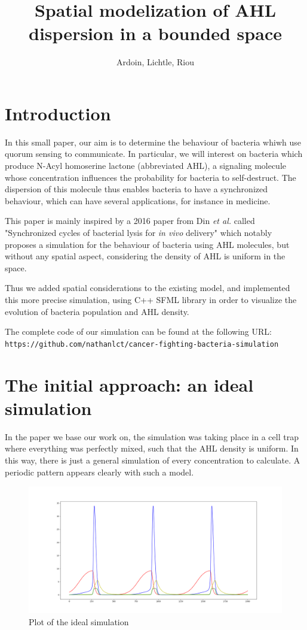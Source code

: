 \documentclass[a4paper]{article}
\title{Spatial modelization of AHL dispersion in a bounded space}
\author{Ardoin, Lichtle, Riou}
\theoremstyle{definition}
\begin{document}
\maketitle

\section*{Introduction}

In this small paper, our aim is to determine the behaviour of bacteria whiwh use quorum sensing to communicate. In particular, we will interest on bacteria which produce N-Acyl homoserine lactone (abbreviated AHL), a signaling molecule whose concentration influences the probability for bacteria to self-destruct. The dispersion of this molecule thus enables bacteria to have a synchronized behaviour, which can have several applications, for instance in medicine.

This paper is mainly inspired by a 2016 paper from Din \textit{et al.} called "Synchronized cycles of bacterial lysis for \textit{in vivo} delivery" which notably proposes a simulation for the behaviour of bacteria using AHL molecules, but without any spatial aspect, considering the density of AHL is uniform in the space.

Thus we added spatial considerations to the existing model, and implemented this more precise simulation, using C++ SFML library in order to visualize the evolution of bacteria population and AHL density.

The complete code of our simulation can be found at the following URL:\\ \texttt{https://github.com/nathanlct/cancer-fighting-bacteria-simulation}

\section{The initial approach: an ideal simulation}

In the paper we base our work on, the simulation was taking place in a cell trap where everything was perfectly mixed, such that the AHL density is uniform. In this way, there is just a general simulation of every concentration to calculate. A periodic pattern appears clearly with such a model.

\begin{figure}[!h]
        \centering
        \includegraphics[width=1\textwidth]{Figure_2.png}
        \caption{Plot of the ideal simulation}
\end{figure}
\end{document}
